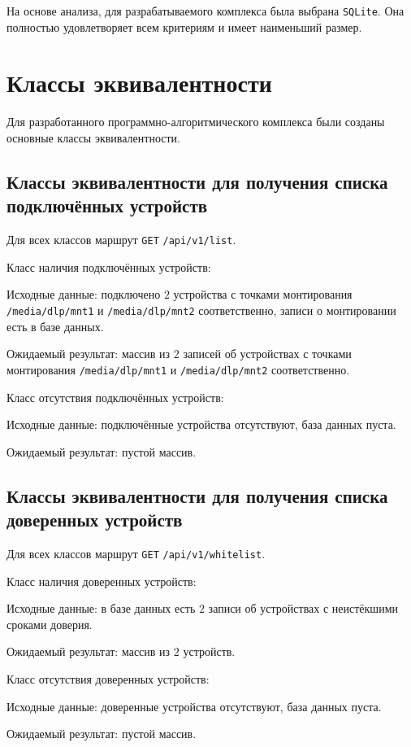 На основе анализа, для разрабатываемого комплекса была выбрана \texttt{SQLite}.
Она полностью удовлетворяет всем критериям и имеет наименьший размер.

\section{Классы эквивалентности}

Для разработанного программно-алгоритмического комплекса были созданы основные классы
эквивалентности.

\subsection{Классы эквивалентности для получения списка подключённых устройств}

Для всех классов маршрут \texttt{GET} \texttt{/api/v1/list}.

Класс наличия подключённых устройств:

Исходные данные: подключено $2$ устройства с точками монтирования \texttt{/media/dlp/mnt1} и \texttt{/media/dlp/mnt2} соответственно, записи о монтировании
есть в базе данных.

Ожидаемый результат: массив из $2$ записей об устройствах с точками монтирования \texttt{/media/dlp/mnt1} и \texttt{/media/dlp/mnt2} соответственно.

Класс отсутствия подключённых устройств:

Исходные данные: подключённые устройства отсутствуют, база данных пуста.

Ожидаемый результат: пустой массив.

\subsection{Классы эквивалентности для получения списка доверенных устройств}

Для всех классов маршрут \texttt{GET} \texttt{/api/v1/whitelist}.

Класс наличия доверенных устройств:

Исходные данные: в базе данных есть $2$ записи об устройствах с неистёкшими сроками доверия.

Ожидаемый результат: массив из $2$ устройств.

Класс отсутствия доверенных устройств:

Исходные данные: доверенные устройства отсутствуют, база данных пуста.

Ожидаемый результат: пустой массив.

